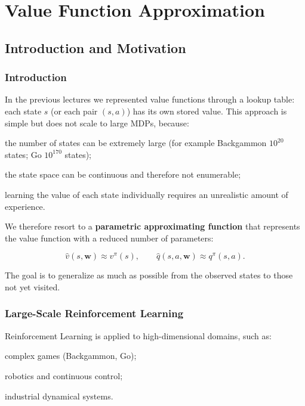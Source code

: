 \chapter{Value Function Approximation}

\section{Introduction and Motivation}
\subsection{Introduction}
In the previous lectures we represented value functions through a lookup table:
each state $s$ (or each pair $(s,a)$) has its own stored value.
This approach is simple but does not scale to large MDPs, because:

\begin{compactitemize}
    \item the number of states can be extremely large (for example Backgammon $10^{20}$ states; Go $10^{170}$ states);
    \item the state space can be continuous and therefore not enumerable;
    \item learning the value of each state individually requires an unrealistic amount of experience.
\end{compactitemize}

We therefore resort to a \textbf{parametric approximating function} that represents the value function with a reduced number of parameters:

\[
\hat{v}(s,\mathbf{w}) \approx v^\pi(s),
\qquad
\hat{q}(s,a,\mathbf{w}) \approx q^\pi(s,a).
\]

The goal is to generalize as much as possible from the observed states to those not yet visited.

\subsection{Large-Scale Reinforcement Learning}

Reinforcement Learning is applied to high-dimensional domains, such as:

\begin{compactitemize}
    \item complex games (Backgammon, Go);
    \item robotics and continuous control;
    \item industrial dynamical systems.
\end{compactitemize}

